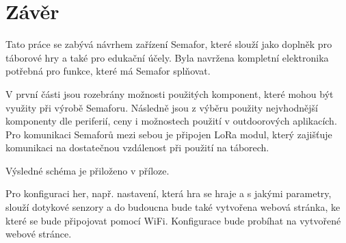 \chapter*{Závěr}
{}

Tato práce se zabývá návrhem zařízení Semafor, které slouží jako doplněk pro táborové hry a také pro edukační účely. Byla navržena kompletní 
elektronika potřebná pro funkce, které má Semafor splňovat. 

V první části jsou rozebrány možnosti použitých komponent, které mohou být využity při výrobě Semaforu. Následně jsou z výběru použity 
nejvhodnější komponenty dle periferií, ceny i možnostech použití v outdoorových aplikacích.
Pro komunikaci Semaforů mezi sebou je připojen LoRa modul, který zajišťuje komunikaci na dostatečnou vzdálenost při použití na táborech. 

Výsledné schéma je přiloženo v příloze. 

Pro konfiguraci her, např. nastavení, která hra se hraje a s jakými parametry, slouží dotykové senzory a do budoucna bude také vytvořena 
webová stránka, ke které se bude připojovat pomocí WiFi. Konfigurace bude probíhat na vytvořené webové stránce. 